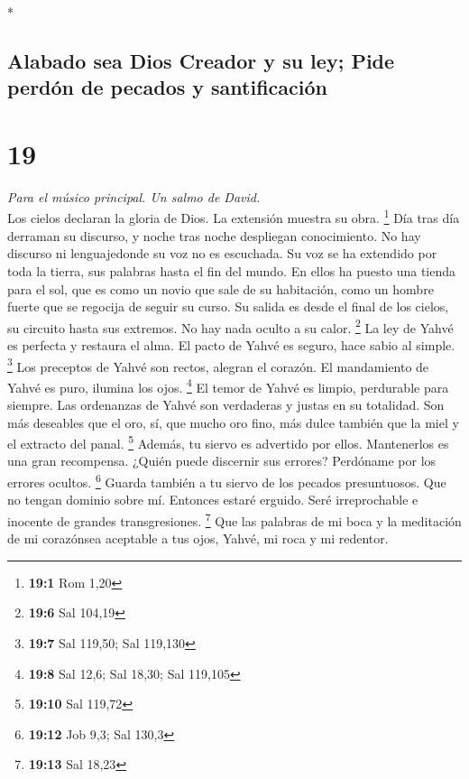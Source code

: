 \begin{paracol}{2}
\begin{otherlanguage}{english}
\end{otherlanguage}

\switchcolumn[0]*

\hypertarget{alabado-sea-dios-creador-y-su-ley-pide-perduxf3n-de-pecados-y-santificaciuxf3n}{%
\subsection{Alabado sea Dios Creador y su ley; Pide perdón de pecados y
santificación}\label{alabado-sea-dios-creador-y-su-ley-pide-perduxf3n-de-pecados-y-santificaciuxf3n}}

\hypertarget{section-36}{%
\section{19}\label{section-36}}

\emph{Para el músico principal. Un salmo de David.}\\
 Los cielos declaran la gloria de Dios. La extensión
muestra su obra. \footnote{\textbf{19:1} Rom 1,20}  Día
tras día derraman su discurso, y noche tras noche despliegan
conocimiento.  No hay discurso ni lenguajedonde su voz no
es escuchada.  Su voz se ha extendido por toda la tierra,
sus palabras hasta el fin del mundo. En ellos ha puesto una tienda para
el sol,  que es como un novio que sale de su habitación,
como un hombre fuerte que se regocija de seguir su curso. 
Su salida es desde el final de los cielos, su circuito hasta sus
extremos. No hay nada oculto a su calor. \footnote{\textbf{19:6} Sal
  104,19}  La ley de Yahvé es perfecta y restaura el alma.
El pacto de Yahvé es seguro, hace sabio al simple. \footnote{\textbf{19:7}
  Sal 119,50; Sal 119,130}  Los preceptos de Yahvé son
rectos, alegran el corazón. El mandamiento de Yahvé es puro, ilumina los
ojos. \footnote{\textbf{19:8} Sal 12,6; Sal 18,30; Sal 119,105}
 El temor de Yahvé es limpio, perdurable para siempre. Las
ordenanzas de Yahvé son verdaderas y justas en su totalidad.
 Son más deseables que el oro, sí, que mucho oro fino,
más dulce también que la miel y el extracto del panal. \footnote{\textbf{19:10}
  Sal 119,72}  Además, tu siervo es advertido por ellos.
Mantenerlos es una gran recompensa.  ¿Quién puede
discernir sus errores? Perdóname por los errores ocultos. \footnote{\textbf{19:12}
  Job 9,3; Sal 130,3}  Guarda también a tu siervo de los
pecados presuntuosos. Que no tengan dominio sobre mí. Entonces estaré
erguido. Seré irreprochable e inocente de grandes transgresiones.
\footnote{\textbf{19:13} Sal 18,23}  Que las palabras de
mi boca y la meditación de mi corazónsea aceptable a tus ojos, Yahvé, mi
roca y mi redentor.


\end{paracol}
